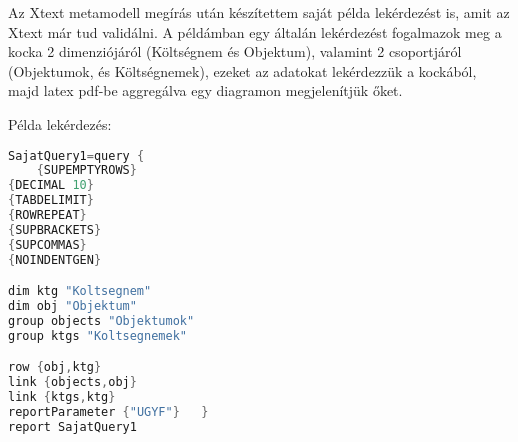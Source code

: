Az Xtext metamodell megírás után készítettem saját példa lekérdezést is, amit az
Xtext már tud validálni. A példámban egy általán lekérdezést fogalmazok meg a
kocka 2 dimenziójáról (Költségnem és Objektum), valamint 2 csoportjáról
(Objektumok, és Költségnemek), ezeket az adatokat lekérdezzük a kockából, majd
latex pdf-be aggregálva egy diagramon megjelenítjük őket.

Példa lekérdezés:
\begin{lstlisting}[language=java,morekeywords={dim,group,row,link,reportParameter,report,query},alsoletter={-},breaklines=true]
SajatQuery1=query {
	{SUPEMPTYROWS}
{DECIMAL 10}
{TABDELIMIT}
{ROWREPEAT}
{SUPBRACKETS}
{SUPCOMMAS}
{NOINDENTGEN}

dim ktg "Koltsegnem"
dim obj "Objektum"
group objects "Objektumok"
group ktgs "Koltsegnemek"

row {obj,ktg}
link {objects,obj}
link {ktgs,ktg}
reportParameter {"UGYF"}   }
report SajatQuery1
\end{lstlisting}